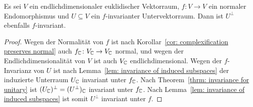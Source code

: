 \documentclass[a4paper,10pt]{article}
\begin{document}
\begin{corollary}
  Es sei $V$ ein endlichdimensionaler euklidischer Vektorraum, $f \colon V \to V$ ein normaler Endomorphismus und $U \subseteq V$ ein $f$-invarianter Untervektorraum.
  Dann ist $U^\perp$ ebenfalls $f$-invariant.
\end{corollary}


\begin{proof}
  Wegen der Normalität von $f$ ist nach Korollar~\ref{cor: complexification preserves normal} auch $f_{\mathbb{C}} \colon V_{\mathbb{C}} \to V_{\mathbb{C}}$ normal, und wegen der Endlichdimensionalität von $V$ ist auch $V_{\mathbb{C}}$ endlichdimensional.
  Wegen der $f$-Invarianz von $U$ ist nach Lemma~\ref{lem: invariance of induced subspaces} der induzierte Unterraum $U_{\mathbb{C}}$ invariant unter $f_{\mathbb{C}}$.
  Nach Theorem~\ref{thrm: invariance for unitary} ist $(U_{\mathbb{C}})^\perp = (U^\perp)_{\mathbb{C}}$ invariant unter $f_{\mathbb{C}}$.
  Nach Lemma~\ref{lem: invariance of induced subspaces} ist somit $U^\perp$ invariant unter $f$.
\end{proof}
\end{document}
